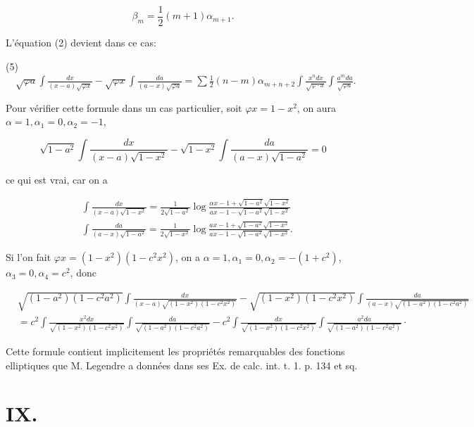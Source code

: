 \documentclass{article}
\begin{document}
\[
\beta_{m}=\frac{1}{2}(m+1) \alpha_{m+1} .
\]

L'équation (2) devient dans ce cas:

(5) \(\quad \sqrt{\varphi a} \int \frac{d x}{(x-a) \sqrt{\varphi x}}-\sqrt{\varphi x} \int \frac{d a}{(a-x) \sqrt{\varphi a}}=\sum \frac{1}{2}(n-m) \alpha_{m+n+2} \int \frac{x^{n} d x}{\sqrt{\varphi \cdot x}} \int \frac{a^{m} d a}{\sqrt{\varphi a}}\).

Pour vérifier cette formule dans un cas particulier, soit \(\varphi x=1-x^{2}\), on aura \(\alpha=1, \alpha_{1}=0, \alpha_{2}=-1\),

\[
\sqrt{1-a^{2}} \int \frac{d x}{(x-a) \sqrt{1-x^{2}}}-\sqrt{1-x^{2}} \int \frac{d a}{(a-x) \sqrt{1-a^{2}}}=0
\]

ce qui est vrai, car on a

\[
\begin{aligned}
& \int \frac{d x}{(x-a) \sqrt{1-x^{2}}}=\frac{1}{2 \sqrt{1-a^{2}}} \log \frac{\alpha x-1+\sqrt{1-a^{2}} \sqrt{1-x^{2}}}{a x-1-\sqrt{1-a^{2}} \sqrt{1-x^{2}}} \\
& \int \frac{d a}{(a-x) \sqrt{1-a^{2}}}=\frac{1}{2 \sqrt{1-x^{2}}} \log \frac{a x-1+\sqrt{1-a^{2}} \sqrt{1-x^{2}}}{a x-1-\sqrt{1-a^{2}} \sqrt{1-x^{2}}} .
\end{aligned}
\]

Si l'on fait \(\varphi x=\left(1-x^{2}\right)\left(1-c^{2} x^{2}\right)\), on a \(\alpha=1, \alpha_{1}=0, \alpha_{2}=-\left(1+c^{2}\right)\), \(\alpha_{3}=0, \alpha_{4}=c^{2}\), donc

\[
\begin{aligned}
& \sqrt{\left(1-a^{2}\right)\left(1-c^{2} a^{2}\right)} \int \frac{d x}{(x-a) \sqrt{\left(1-x^{2}\right)\left(1-c^{2} x^{2}\right)}}-\sqrt{\left(1-x^{2}\right)\left(1-c^{2} x^{2}\right)} \int \frac{d a}{(a-x) \sqrt{\left(1-a^{2}\right)\left(1-c^{2} a^{2}\right)}} \\
& =c^{2} \int \frac{x^{2} d x}{\sqrt{\left(1-x^{2}\right)\left(1-c^{2} x^{2}\right)}} \int \frac{d a}{\sqrt{\left(1-a^{2}\right)\left(1-c^{2} a^{2}\right)}}-c^{2} \int \frac{d x}{\sqrt{\left(1-x^{2}\right)\left(1-c^{2} x^{2}\right)}} \int \frac{a^{2} d a}{\sqrt{\left(1-a^{2}\right)\left(1-c^{2} a^{2}\right)}} \cdot
\end{aligned}
\]

Cette formule contient implicitement les propriétés remarquables des fonctions elliptiques que M. Legendre a données dans ses Ex. de calc. int. t. 1. p. 134 et sq.

\section*{IX.}
\end{document}
